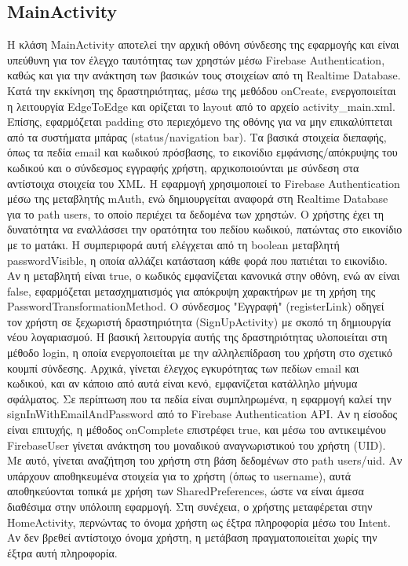 \documentclass[11pt]{report}
\begin{document}
\subsection{MainActivity}

Η κλάση MainActivity αποτελεί την αρχική οθόνη σύνδεσης της εφαρμογής και είναι υπεύθυνη για τον έλεγχο ταυτότητας των χρηστών μέσω Firebase Authentication, καθώς και για την ανάκτηση των βασικών τους στοιχείων από τη Realtime Database. Κατά την εκκίνηση της δραστηριότητας, μέσω της μεθόδου onCreate, ενεργοποιείται η λειτουργία EdgeToEdge και ορίζεται το layout από το αρχείο activity\_main.xml. Επίσης, εφαρμόζεται padding στο περιεχόμενο της οθόνης για να μην επικαλύπτεται από τα συστήματα μπάρας (status/navigation bar). Τα βασικά στοιχεία διεπαφής, όπως τα πεδία email και κωδικού πρόσβασης, το εικονίδιο εμφάνισης/απόκρυψης του κωδικού και ο σύνδεσμος εγγραφής χρήστη, αρχικοποιούνται με σύνδεση στα αντίστοιχα στοιχεία του XML.
Η εφαρμογή χρησιμοποιεί το Firebase Authentication μέσω της μεταβλητής mAuth, ενώ δημιουργείται αναφορά στη Realtime Database για το path users, το οποίο περιέχει τα δεδομένα των χρηστών. Ο χρήστης έχει τη δυνατότητα να εναλλάσσει την ορατότητα του πεδίου κωδικού, πατώντας στο εικονίδιο με το ματάκι. Η συμπεριφορά αυτή ελέγχεται από τη boolean μεταβλητή passwordVisible, η οποία αλλάζει κατάσταση κάθε φορά που πατιέται το εικονίδιο. Αν η μεταβλητή είναι true, ο κωδικός εμφανίζεται κανονικά στην οθόνη, ενώ αν είναι false, εφαρμόζεται μετασχηματισμός για απόκρυψη χαρακτήρων με τη χρήση της PasswordTransformationMethod.
Ο σύνδεσμος "Εγγραφή" (registerLink) οδηγεί τον χρήστη σε ξεχωριστή δραστηριότητα (SignUpActivity) με σκοπό τη δημιουργία νέου λογαριασμού. Η βασική λειτουργία αυτής της δραστηριότητας υλοποιείται στη μέθοδο login, η οποία ενεργοποιείται με την αλληλεπίδραση του χρήστη στο σχετικό κουμπί σύνδεσης. Αρχικά, γίνεται έλεγχος εγκυρότητας των πεδίων email και κωδικού, και αν κάποιο από αυτά είναι κενό, εμφανίζεται κατάλληλο μήνυμα σφάλματος.
Σε περίπτωση που τα πεδία είναι συμπληρωμένα, η εφαρμογή καλεί την signInWithEmailAndPassword από το Firebase Authentication API. Αν η είσοδος είναι επιτυχής, η μέθοδος onComplete επιστρέφει true, και μέσω του αντικειμένου FirebaseUser γίνεται ανάκτηση του μοναδικού αναγνωριστικού του χρήστη (UID). Με αυτό, γίνεται αναζήτηση του χρήστη στη βάση δεδομένων στο path users/{uid}. Αν υπάρχουν αποθηκευμένα στοιχεία για το χρήστη (όπως το username), αυτά αποθηκεύονται τοπικά με χρήση των SharedPreferences, ώστε να είναι άμεσα διαθέσιμα στην υπόλοιπη εφαρμογή. Στη συνέχεια, ο χρήστης μεταφέρεται στην HomeActivity, περνώντας το όνομα χρήστη ως έξτρα πληροφορία μέσω του Intent. Αν δεν βρεθεί αντίστοιχο όνομα χρήστη, η μετάβαση πραγματοποιείται χωρίς την έξτρα αυτή πληροφορία.
\end{document}
